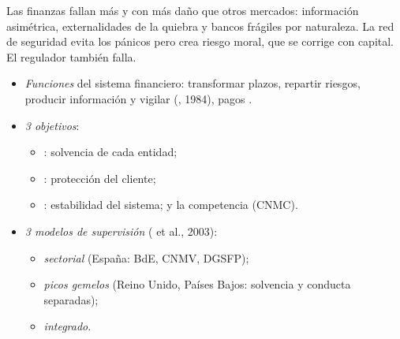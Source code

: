\documentclass{article}
\begin{document}
\begin{columnas}
\begin{ideaclave}
Las finanzas fallan más y con más daño que otros mercados: información asimétrica, externalidades de la quiebra y bancos frágiles por naturaleza. La red de seguridad evita los pánicos pero crea riesgo moral, que se corrige con capital. El regulador también falla.
\end{ideaclave}

\begin{itemize}
\item \emph{Funciones} del sistema financiero: transformar plazos, repartir riesgos, producir información y vigilar (, 1984), pagos .
\item \emph{3 objetivos}:
  \begin{itemize}
  \item {}: solvencia de cada entidad;
  \item {}: protección del cliente;
  \item {}: estabilidad del sistema; y la competencia (CNMC).
  \end{itemize}
\item \emph{3 modelos de supervisión} ( et al., 2003):
  \begin{itemize}
  \item \emph{sectorial} (España: BdE, CNMV, DGSFP);
  \item \emph{picos gemelos} (Reino Unido, Países Bajos: solvencia y conducta separadas);
  \item \emph{integrado}.
  \end{itemize}
\end{itemize}


\end{columnas}
\end{document}
